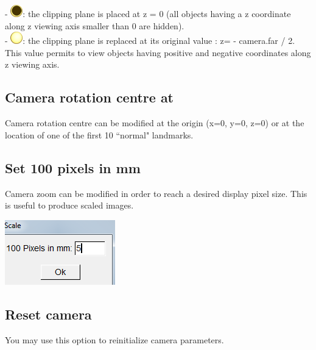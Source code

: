 \noindent
- \includegraphics[scale=0.7]{images/pixmap/Clipping_plane_z0.png}: the clipping plane is placed at z = 0 (all objects having a z coordinate along z viewing axis smaller than 0 are hidden).\\
\noindent- \includegraphics[scale=0.7]{images/pixmap/Clipping_plane_normal.png}: the clipping plane is replaced at its original value : z= - camera.far / 2. This value permits to view objects having positive and negative coordinates along z viewing axis.

\subsection{Camera rotation centre at}



Camera rotation centre can be modified at the origin (x=0, y=0, z=0) or at the location of one of the first 10 ``normal" landmarks.

\subsection{Set 100 pixels in mm}

\noindent
\begin{minipage}{0.55\textwidth}
Camera zoom can be modified in order to reach a desired display pixel size. This is useful to produce scaled images.

\end{minipage}  
 \begin{minipage}{0.45\textwidth}\centering
  \includegraphics[scale=0.5]{images/Icons/100px_mm.png}

 \end{minipage} 
\noindent


\subsection{Reset camera}
You may use this option to reinitialize camera parameters.
